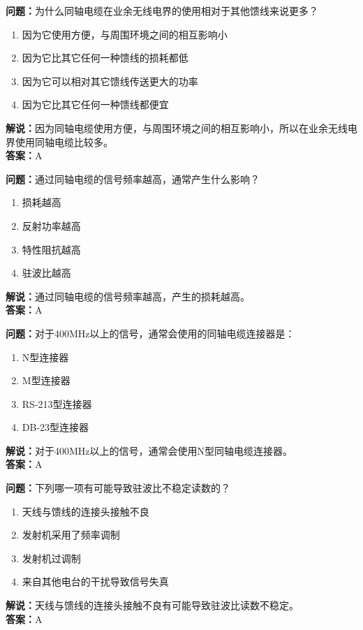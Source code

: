 \documentclass[UTF8]{ctexbook}
\begin{document}
\textbf{问题：}为什么同轴电缆在业余无线电界的使用相对于其他馈线来说更多？
\begin{enumerate}[label=\Alph*), leftmargin=3em]
  \item 因为它使用方便，与周围环境之间的相互影响小
  \item 因为它比其它任何一种馈线的损耗都低
  \item 因为它可以相对其它馈线传送更大的功率
  \item 因为它比其它任何一种馈线都便宜
\end{enumerate}
\textbf{解说：}因为同轴电缆使用方便，与周围环境之间的相互影响小，所以在业余无线电界使用同轴电缆比较多。\\
\textbf{答案：}A

\textbf{问题：}通过同轴电缆的信号频率越高，通常产生什么影响？
\begin{enumerate}[label=\Alph*), leftmargin=3em]
  \item 损耗越高
  \item 反射功率越高
  \item 特性阻抗越高
  \item 驻波比越高
\end{enumerate}
\textbf{解说：}通过同轴电缆的信号频率越高，产生的损耗越高。\\
\textbf{答案：}A

\textbf{问题：}对于400MHz以上的信号，通常会使用的同轴电缆连接器是：
\begin{enumerate}[label=\Alph*), leftmargin=3em]
  \item N型连接器
  \item M型连接器
  \item RS-213型连接器
  \item DB-23型连接器
\end{enumerate}
\textbf{解说：}对于400MHz以上的信号，通常会使用N型同轴电缆连接器。\\
\textbf{答案：}A

\textbf{问题：}下列哪一项有可能导致驻波比不稳定读数的？
\begin{enumerate}[label=\Alph*), leftmargin=3em]
  \item 天线与馈线的连接头接触不良
  \item 发射机采用了频率调制
  \item 发射机过调制
  \item 来自其他电台的干扰导致信号失真
\end{enumerate}
\textbf{解说：}天线与馈线的连接头接触不良有可能导致驻波比读数不稳定。\\
\textbf{答案：}A
\end{document}
